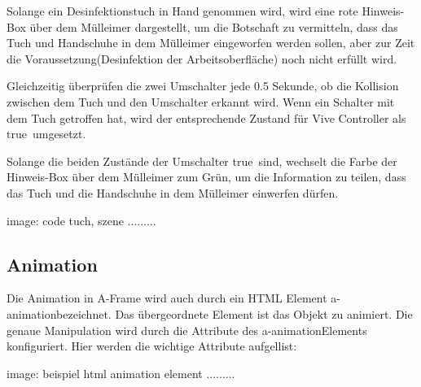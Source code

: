 Solange ein Desinfektionstuch in Hand genommen wird, wird eine rote Hinweis-Box über dem Mülleimer dargestellt, um die Botschaft zu vermitteln, dass das Tuch und Handschuhe in dem Mülleimer eingeworfen werden sollen, aber zur Zeit die Voraussetzung(Desinfektion der Arbeitsoberfläche) noch nicht erfüllt wird.
 
 Gleichzeitig überprüfen die zwei Umschalter jede 0.5 Sekunde, ob die Kollision zwischen dem Tuch und den Umschalter erkannt wird. Wenn ein Schalter mit dem Tuch getroffen hat, wird der entsprechende Zustand für Vive Controller als \glqq true\grqq\ umgesetzt.
 
 Solange die beiden Zustände der Umschalter \glqq true\grqq\ sind, wechselt die Farbe der Hinweis-Box über dem Mülleimer zum Grün, um die Information zu teilen, dass das Tuch und die Handschuhe in dem Mülleimer einwerfen dürfen.
 
 image: code tuch, szene .........
 
 \subsection{Animation}
 Die Animation in A-Frame wird auch durch ein HTML Element \glqq a-animation\grqq bezeichnet. Das übergeordnete Element ist das Objekt zu animiert. Die genaue Manipulation wird durch die Attribute des \glqq a-animation\grqq Elements konfiguriert. Hier werden die wichtige Attribute aufgellist:
 
 image: beispiel html animation element .........
 
